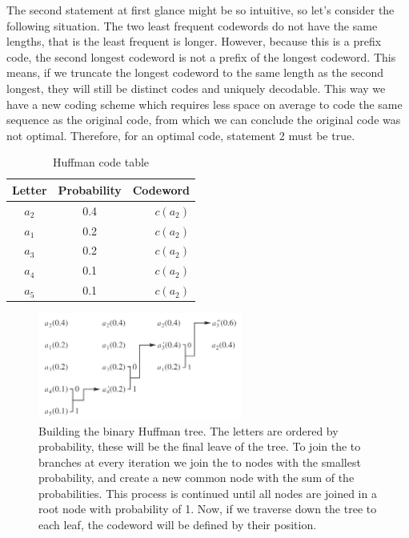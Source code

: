 \documentclass{diploma_style}
\begin{document}
The second statement at first glance might be so intuitive, so let's consider the following situation. The two least frequent codewords do not have the same lengths, that is the least frequent is longer. However, because this is a prefix code, the second longest codeword is not a prefix of the longest codeword. This means, if we truncate the longest codeword to the same length as the second longest, they will still be distinct codes and uniquely decodable. This way we have a new coding scheme which requires less space on average to code the same sequence as the original code, from which we can conclude the original code was not optimal. Therefore, for an optimal code, statement 2 must be true.

\begin{table}
\caption{Huffman code table}
\centering
\begin{tabular}{ccr}
\toprule
Letter & Probability & Codeword \\
\midrule
$a_2$ & 0.4 & $c(a_2)$ \\
$a_1$ & 0.2 & $c(a_2)$ \\
$a_3$ & 0.2 & $c(a_2)$ \\
$a_4$ & 0.1 & $c(a_2)$ \\
$a_5$ & 0.1 & $c(a_2)$ \\
\bottomrule
\end{tabular}
\label{tab:huffman1}
\end{table}

\begin{figure}
\centering
\includegraphics[width=0.6\textwidth]{figures/3_compression/huffman}
\caption{Building the binary Huffman tree. The letters are ordered by probability, these will be the final leave of the tree. To join the to branches at every iteration we join the to nodes with the smallest probability, and create a new common node with the sum of the probabilities. This process is continued until all nodes are joined in a root node with probability of 1. Now, if we traverse down the tree to each leaf, the codeword will be defined by their position. }
\label{fig:huffman}
\end{figure}
\end{document}
